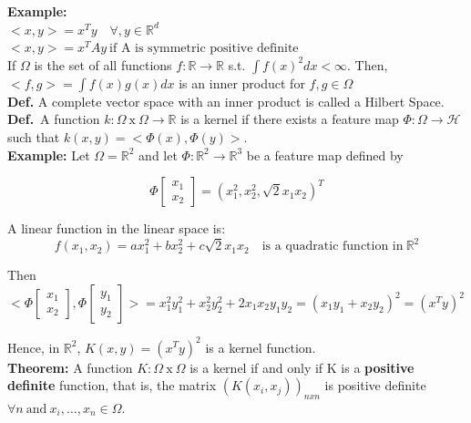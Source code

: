 \documentclass[11pt, english]{article}
\begin{document}
\textbf{Example:}\\

$<x,y> = x^Ty \quad \forall ,y \in \mathbb{R}^d$\\

$<x,y> = x^TAy \ \text{if A is symmetric positive definite}$\\

If $\Omega$ is the set of all functions $f: \mathbb{R} \rightarrow \mathbb{R}$ s.t. $\int f(x)^2 dx < \infty$. Then,\\

$<f,g> = \int f(x) g(x) dx$ is an inner product for $f, g \in \Omega$\\

\textbf{Def.} A complete vector space with an inner product is called a Hilbert Space.\\

\textbf{Def.}\ A function $k : \Omega \ \text{x}\ \Omega \rightarrow \mathbb{R}$ is a kernel if there exists a feature map $\Phi : \Omega \rightarrow \mathcal{H}$ such that $k(x,y) = <\Phi(x), \Phi(y)>$.\\

\textbf{Example:} Let $\Omega = \mathbb{R}^2$ and let $\Phi : \mathbb{R}^2 \rightarrow \mathbb{R}^3$ be a feature map defined by

$$
\Phi \begin{bmatrix}
x_1 \\
x_2
\end{bmatrix} = (x^2_1, x^2_2, \sqrt{2}x_1x_2)^T
$$



A linear function in the linear space is:
$$f(x_1,x_2) = ax^2_1 + bx^2_2 + c\sqrt{2}x_1x_2 \quad \text{is a quadratic function in}\ \mathbb{R}^2$$

Then $<\Phi\begin{bmatrix}
x_1 \\
x_2
\end{bmatrix}, \Phi\begin{bmatrix}
y_1 \\
y_2
\end{bmatrix}> = x^2_1y_1^2 + x_2^2y_2^2 + 2x_1x_2y_1y_2 = (x_1y_1 + x_2y_2)^2 = (x^Ty)^2$

Hence, in $\mathbb{R}^2$, $K(x,y) = (x^Ty)^2$ is a kernel function.\\

\textbf{Theorem:} A function $K : \Omega\ \text{x}\ \Omega$ is a kernel if and only if K is a \textbf{positive definite} function, that is, the matrix $(K(x_i,x_j))_{n x n}$ is positive definite $\forall n\ \text{and}\ x_i, \dots, x_n \in \Omega$.
\end{document}

